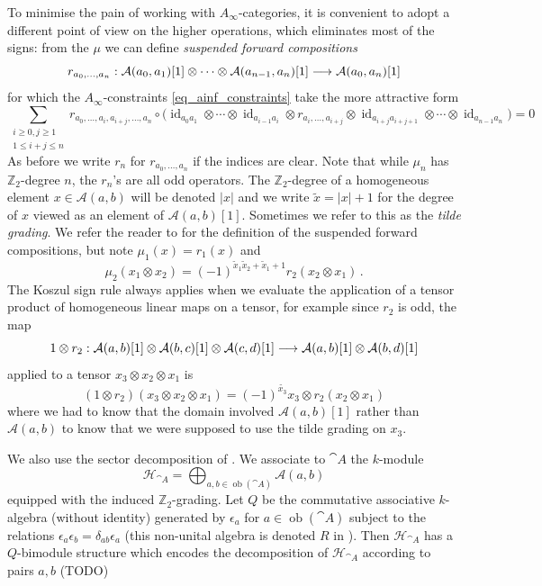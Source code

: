 \documentclass[english,letter paper,12pt,leqno]{article}
\theoremstyle{example}
\numberwithin{equation}{section}
\def\AA{\mathcal{A}}
\def\HH{\HH}
\def\HH{\mathcal{H}}
\def\be{\begin{equation}}
\def\ee{\end{equation}}
\def\nZ{\mathds{Z}}
\begin{document}
To minimise the pain of working with $A_\infty$-categories, it is convenient to adopt a different point of view on the higher operations, which eliminates most of the signs: from the $\mu$ we can define \emph{suspended forward compositions} \cite[\S 2.1]{lazaroiu}
\be
r_{a_0,\ldots,a_n}: \AA(a_0, a_1)[1] \otimes \cdots \otimes \AA(a_{n-1}, a_n)[1] \lto \AA(a_0,a_n)[1]
\ee
for which the $A_\infty$-constraints \eqref{eq_ainf_constraints} take the more attractive form
\[
\sum_{\substack{i \ge 0, j \ge 1 \\ 1 \le i + j \le n}} r_{a_0, \ldots, a_i, a_{i+j}, \ldots, a_n} \circ \Big( \operatorname{id}_{a_0a_1} \otimes \cdots \otimes \operatorname{id}_{a_{i-1}a_i} \otimes r_{a_i,\ldots,a_{i+j}} \otimes \operatorname{id}_{a_{i+j}a_{i+j+1}} \otimes \cdots \otimes \operatorname{id}_{a_{n-1}a_n} \Big) = 0
\]
As before we write $r_n$ for $r_{a_0,\ldots,a_n}$ if the indices are clear. Note that while $\mu_n$ has $\nZ_2$-degree $n$, the $r_n$'s are all odd operators. The $\nZ_2$-degree of a homogeneous element $x \in \AA(a,b)$ will be denoted $|x|$ and we write $\widetilde{x} = |x| + 1$ for the degree of $x$ viewed as an element of $\AA(a,b)[1]$. Sometimes we refer to this as the \emph{tilde grading}. We refer the reader to \cite{lazaroiu} for the definition of the suspended forward compositions, but note $\mu_1(x) = r_1(x)$ and
\be\label{eq:mu2vsr2}
\mu_2(x_1 \otimes x_2) = (-1)^{\widetilde{x}_1\widetilde{x}_2 + \widetilde{x}_1 + 1} r_2(x_2 \otimes x_1)\,.
\ee
The Koszul sign rule always applies when we evaluate the application of a tensor product of homogeneous linear maps on a tensor, for example since $r_2$ is odd, the map
\[
1 \otimes r_2: \AA(a,b)[1] \otimes \AA(b,c)[1] \otimes \AA(c,d)[1] \lto \AA(a,b)[1] \otimes \AA(b,d)[1]
\]
applied to a tensor $x_3 \otimes x_2 \otimes x_1$ is
\[
(1 \otimes r_2)(x_3 \otimes x_2 \otimes x_1) = (-1)^{\widetilde{x_3}} x_3 \otimes r_2( x_2 \otimes x_1 )
\]
where we had to know that the domain involved $\AA(a,b)[1]$ rather than $\AA(a,b)$ to know that we were supposed to use the tilde grading on $x_3$. %

We also use the sector decomposition of \cite[\S 2.2]{lazaroiu}. We associate to $\cat{A}$ the $k$-module
\[
\HH_{\cat{A}} = \bigoplus_{a,b \in \operatorname{ob}(\cat{A})} \AA(a,b)
\]
equipped with the induced $\nZ_2$-grading. Let $Q$ be the commutative associative $k$-algebra (without identity) generated by $\epsilon_a$ for $a \in \operatorname{ob}(\cat{A})$ subject to the relations $\epsilon_a \epsilon_b = \delta_{ab} \epsilon_a$ (this non-unital algebra is denoted $R$ in \cite{lazaroiu}). Then $\HH_{\cat{A}}$ has a $Q$-bimodule structure which encodes the decomposition of $\HH_{\cat{A}}$ according to pairs $a,b$ (TODO)
\end{document}
